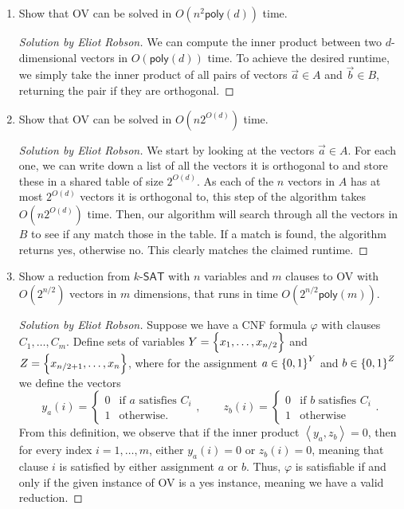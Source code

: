 \documentclass{article}
\newenvironment{solution}[1]{\begin{proof}[Solution by #1]}{\end{proof}}
\newcommand{\inp}[1]{\left\langle #1 \right\rangle} %
\newcommand{\poly}{\mathsf{poly}}
\newcommand{\SAT}{\mathsf{SAT}}
\begin{document}
\begin{enumerate}
    \item Show that OV can be solved in \(O(n^2 \poly(d))\) time.
    
    \begin{solution}{Eliot Robson}
        We can compute the inner product between two \(d\)-dimensional vectors in \(O(\poly(d))\) time. To achieve the desired runtime, we simply take the inner product of all pairs of vectors \(\vec{a} \in A\) and \(\vec{b} \in B\), returning the pair if they are orthogonal.
    \end{solution}
    
    \item Show that OV can be solved in \(O(n 2^{O(d)})\) time.
    
    \begin{solution}{Eliot Robson}
        We start by looking at the vectors \(\vec{a} \in A\). For each one, we can write down a list of all the vectors it is orthogonal to and store these in a shared table of size \(2^{O(d)}\). As each of the \(n\) vectors in \(A\) has at most \(2^{O(d)}\) vectors it is orthogonal to, this step of the algorithm takes \(O(n 2^{O(d)})\) time. Then, our algorithm will search through all the vectors in \(B\) to see if any match those in the table. If a match is found, the algorithm returns yes, otherwise no. This clearly matches the claimed runtime.
    \end{solution}
    
    \item Show a reduction from \(k\)-\(\SAT\) with \(n\) variables and \(m\) clauses to OV with \(O(2^{n/2})\) vectors in \(m\) dimensions, that runs in time \(O(2^{n/2} \poly(m))\).
    
    \begin{solution}{Eliot Robson}
        Suppose we have a CNF formula \(\varphi\) with clauses \(C_1, \dots, C_m\). Define sets of variables \(Y = \set{x_1, \dots, x_{n/2}}\) and \(Z = \set{x_{n/2 + 1}, \dots, x_n}\), where for the assignment \(a \in \set{0,1}^Y\) and \(b \in \set{0,1}^Z\) we define the vectors
        \[
            y_a (i)
            =%
            \begin{cases}
                0 &\text{if \(a\) satisfies \(C_i\)}\\
                1 &\text{otherwise}.
            \end{cases},
            \qquad
            z_b (i)
            =%
            \begin{cases}
                0 &\text{if \(b\) satisfies \(C_i\)}\\
                1 &\text{otherwise}
            \end{cases}.
        \]
        From this definition, we observe that if the inner product \(\inp{y_a, z_b} = 0\), then for every index \(i = 1, \dots, m\), either \(y_a(i) = 0\) or \(z_b(i) = 0\), meaning that clause \(i\) is satisfied by either assignment \(a\) or \(b\). Thus, \(\varphi\) is satisfiable if and only if the given instance of OV is a yes instance, meaning we have a valid reduction.
        

\end{solution}
\end{enumerate}
\end{document}
